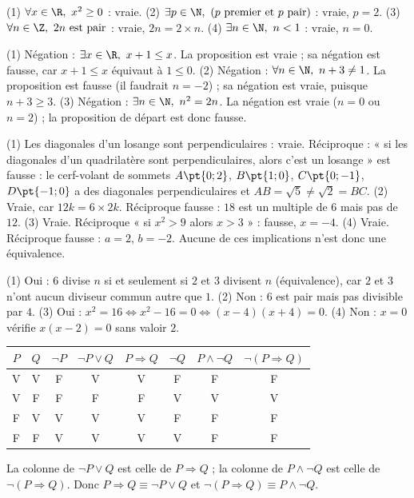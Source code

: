 \begin{solution}
(1) $\forall x\in\R,\ x^2\ge0$ : vraie. (2) $\exists p\in\N,\ (p\text{ premier et }p\text{ pair})$ : vraie, $p=2$. (3) $\forall n\in\Z,\ 2n\text{ est pair}$ : vraie, $2n=2\times n$. (4) $\exists n\in\N,\ n<1$ : vraie, $n=0$.
\end{solution}
\begin{solution}
(1) Négation : $\exists x\in\R,\ x+1\le x$. La proposition est vraie ; sa négation est fausse, car $x+1\le x$ équivaut à $1\le0$. (2) Négation : $\forall n\in\N,\ n+3\ne1$. La proposition est fausse (il faudrait $n=-2$) ; sa négation est vraie, puisque $n+3\ge3$. (3) Négation : $\exists n\in\N,\ n^2=2n$. La négation est vraie ($n=0$ ou $n=2$) ; la proposition de départ est donc fausse.
\end{solution}
\begin{solution}
(1) Les diagonales d'un losange sont perpendiculaires : vraie. Réciproque : « si les diagonales d'un quadrilatère sont perpendiculaires, alors c'est un losange » est fausse : le cerf-volant de sommets $A\pt{0;2}$, $B\pt{1;0}$, $C\pt{0;-1}$, $D\pt{-1;0}$ a des diagonales perpendiculaires et $AB=\sqrt5\ne\sqrt2=BC$. (2) Vraie, car $12k=6\times2k$. Réciproque fausse : $18$ est un multiple de $6$ mais pas de $12$. (3) Vraie. Réciproque « si $x^2>9$ alors $x>3$ » : fausse, $x=-4$. (4) Vraie. Réciproque fausse : $a=2$, $b=-2$. Aucune de ces implications n'est donc une équivalence.
\end{solution}
\begin{solution}
(1) Oui : $6$ divise $n$ si et seulement si $2$ et $3$ divisent $n$ (équivalence), car $2$ et $3$ n'ont aucun diviseur commun autre que $1$. (2) Non : $6$ est pair mais pas divisible par $4$. (3) Oui : $x^2=16\Leftrightarrow x^2-16=0\Leftrightarrow(x-4)(x+4)=0$. (4) Non : $x=0$ vérifie $x(x-2)=0$ sans valoir $2$.
\end{solution}
\begin{solution}
\begin{center}
\begin{tabular}{c|c||c|c|c||c|c|c}
$P$ & $Q$ & $\lnot P$ & $\lnot P\lor Q$ & $P\Rightarrow Q$ & $\lnot Q$ & $P\land\lnot Q$ & $\lnot(P\Rightarrow Q)$\\\hline
V & V & F & V & V & F & F & F\\
V & F & F & F & F & V & V & V\\
F & V & V & V & V & F & F & F\\
F & F & V & V & V & V & F & F
\end{tabular}
\end{center}
La colonne de $\lnot P\lor Q$ est celle de $P\Rightarrow Q$ ; la colonne de $P\land\lnot Q$ est celle de $\lnot(P\Rightarrow Q)$. Donc $P\Rightarrow Q\equiv\lnot P\lor Q$ et $\lnot(P\Rightarrow Q)\equiv P\land\lnot Q$.
\end{solution}
